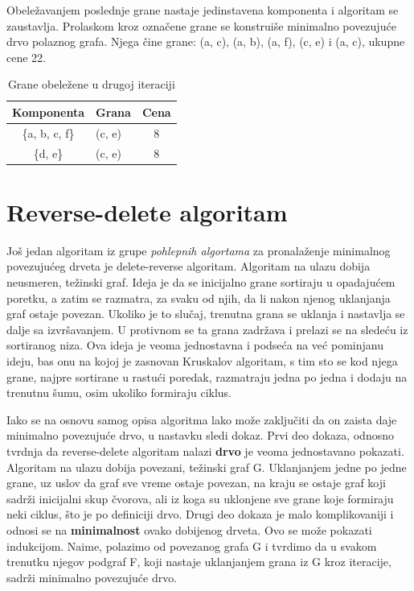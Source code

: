 \documentclass[12pt,oneside]{memoir}
\begin{document}
Obeležavanjem poslednje grane nastaje jedinstavena komponenta i algoritam se zaustavlja. Prolaskom kroz označene grane se konstruiše minimalno povezujuće drvo polaznog grafa. Njega čine grane: (a, c), (a, b), (a, f), (c, e) i (a, c), ukupne cene 22. 

\begin{table}
\centering
\label{tbl:boruvka2}
\begin{tabular}{|c|>{\centering}p{2cm}|c|}
\hline
 Komponenta & Grana & Cena\\ 
\hline
\{a, b, c, f\} & (c, e) & 8\\
\hline
\{d, e\} & (c, e) & 8\\
\hline
\end{tabular}
\caption{Grane obeležene u drugoj iteraciji}
\end{table}

\section{Reverse-delete algoritam}
Još jedan algoritam iz grupe \textit{pohlepnih algortama} za pronalaženje minimalnog povezujućeg drveta je delete-reverse algoritam. Algoritam na ulazu dobija neusmeren, težinski graf. Ideja je da se inicijalno grane sortiraju u opadajućem poretku, a zatim se razmatra, za svaku od njih, da li nakon njenog uklanjanja graf ostaje povezan. Ukoliko je to slučaj, trenutna grana se uklanja i nastavlja se dalje sa izvršavanjem. U protivnom se ta grana zadržava i prelazi se na sledeću iz sortiranog niza. Ova ideja je veoma jednostavna i podseća na već pominjanu ideju, bas onu na kojoj je zasnovan Kruskalov algoritam, s tim sto se kod njega grane, najpre sortirane u rastući poredak, razmatraju jedna po jedna i dodaju na trenutnu šumu, osim ukoliko formiraju ciklus. 

Iako se na osnovu samog opisa algoritma lako može zaključiti da on zaista daje minimalno povezujuće drvo, u nastavku sledi dokaz.
Prvi deo dokaza, odnosno tvrdnja da reverse-delete algoritam nalazi \textbf{drvo} je veoma jednostavano pokazati. Algoritam na ulazu dobija povezani, težinski graf G. Uklanjanjem jedne po jedne grane, uz uslov da graf sve vreme ostaje povezan, na kraju se ostaje graf koji sadrži inicijalni skup čvorova, ali iz koga su uklonjene sve grane koje formiraju neki ciklus, što je po definiciji drvo.
Drugi deo dokaza je malo komplikovaniji i odnosi se na \textbf{minimalnost} ovako dobijenog drveta. Ovo se može pokazati indukcijom. Naime, polazimo od povezanog grafa G i tvrdimo da u svakom trenutku njegov podgraf F, koji nastaje uklanjanjem grana iz G kroz iteracije, sadrži minimalno povezujuće drvo.
\end{document}
